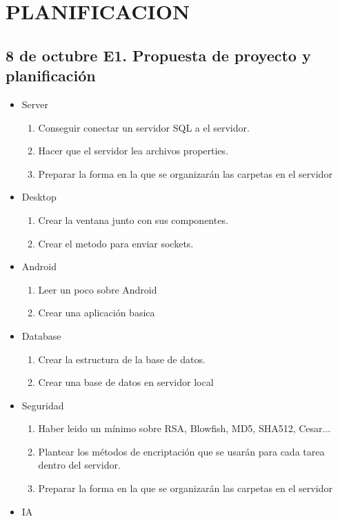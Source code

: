 \documentclass{article}
\theoremstyle{definition}
\begin{document}
\section{PLANIFICACION}

\subsection{8 de octubre	E1. Propuesta de proyecto y planificación }

\begin{itemize}
\item Server \begin{enumerate}
\item Conseguir conectar un servidor SQL a el servidor.
\item Hacer que el servidor lea archivos properties.
\item Preparar la forma en la que se organizarán las carpetas en el servidor
\end{enumerate}
\item Desktop \begin{enumerate}
\item Crear la ventana junto con sus componentes.
\item Crear el metodo para enviar sockets.
\end{enumerate}
\item Android \begin{enumerate}
\item Leer un poco sobre Android
\item Crear una aplicación basica
\end{enumerate}
\item Database \begin{enumerate}
\item Crear la estructura de la base de datos.
\item Crear una base de datos en servidor local
\end{enumerate}
\item Seguridad \begin{enumerate}
\item Haber leido un mínimo sobre RSA, Blowfish, MD5, SHA512, Cesar... 
\item Plantear los métodos de encriptación que se usarán para cada tarea dentro del servidor.
\item Preparar la forma en la que se organizarán las carpetas en el servidor
\end{enumerate}
\item IA \begin{enumerate}

\end{enumerate}
\end{itemize}
\end{document}
